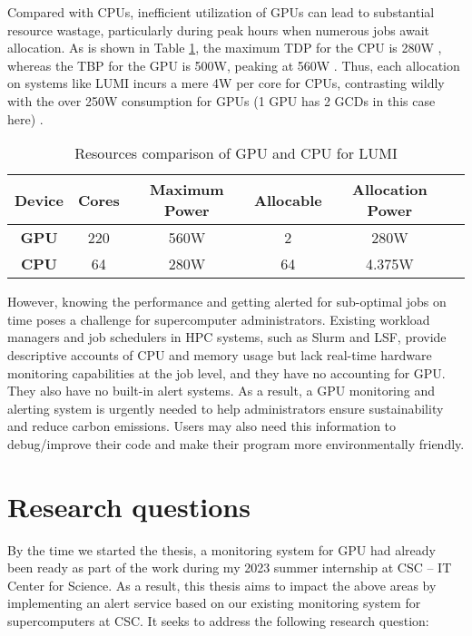 Compared with CPUs, inefficient utilization of GPUs can lead to substantial resource wastage, particularly during peak hours when numerous jobs await allocation. As is shown in Table \ref{tab:lumi_resources}, the maximum TDP for the CPU is 280W \cite{amd-epyc-cpu}, whereas the TBP for the GPU is 500W, peaking at 560W \cite{amd-mi250x}. Thus, each allocation on systems like LUMI incurs a mere 4W per core for CPUs, contrasting wildly with the over 250W consumption for GPUs (1 GPU has 2 GCDs in this case here) \cite{lumi}.

\begin{table}[H]
    \centering
    \begin{tabular}{|c|c|c|c|c|c|}
        \hline
        \textbf{Device} & \textbf{Cores} & \textbf{Maximum Power} & \textbf{Allocable} & \textbf{Allocation Power} \\
        \hline
        \textbf{GPU} & 220 & 560W & 2 & 280W \\
        \hline
        \textbf{CPU} & 64 & 280W & 64 & 4.375W \\
        \hline
    \end{tabular}
    \caption{Resources comparison of GPU and CPU for LUMI}
    \label{tab:lumi_resources}
\end{table}

However, knowing the performance and getting alerted for sub-optimal jobs on time poses a challenge for supercomputer administrators. Existing workload managers and job schedulers in HPC systems, such as Slurm and LSF, provide descriptive accounts of CPU and memory usage but lack real-time hardware monitoring capabilities at the job level, and they have no accounting for GPU. They also have no built-in alert systems. As a result, a GPU monitoring and alerting system is urgently needed to help administrators ensure sustainability and reduce carbon emissions. Users may also need this information to debug/improve their code and make their program more environmentally friendly.

\section{Research questions}
\label{sec:rqs}
By the time we started the thesis, a monitoring system for GPU had already been ready as part of the work during my 2023 summer internship at CSC -- IT Center for Science. As a result, this thesis aims to impact the above areas by implementing an alert service based on our existing monitoring system for supercomputers at CSC. It seeks to address the following research question:

